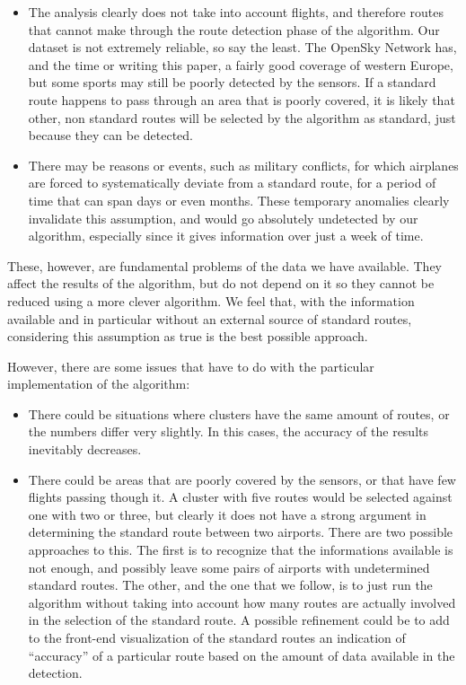 \documentclass{vldb}
\begin{document}
\begin{itemize}
  \item The analysis clearly does not take into account flights, and therefore
  routes that cannot make through the route detection phase of the algorithm.
  Our dataset is not extremely reliable, so say the least. The OpenSky Network
  has, and the time or writing this paper, a fairly good coverage of western
  Europe, but some sports may still be poorly detected by the sensors. If a
  standard route happens to pass through an area that is poorly covered, it is
  likely that other, non standard routes will be selected by the algorithm as
  standard, just because they can be detected.
  \item There may be reasons or events, such as military conflicts, for which
  airplanes are forced to systematically deviate from a standard route, for a
  period of time that can span days or even months. These temporary anomalies
  clearly invalidate this assumption, and would go absolutely undetected by our
  algorithm, especially since it gives information over just a week of time.
\end{itemize}

These, however, are fundamental problems of the data we have available. They
affect the results of the algorithm, but do not depend on it so they cannot be
reduced using a more clever algorithm. We feel that, with the information
available and in particular without an external source
of standard routes, considering this assumption as true is the best
possible approach.

However, there are some issues that have to do with the particular
implementation of the algorithm:

\begin{itemize}
  \item There could be situations where clusters have the same amount of routes,
  or the numbers differ very slightly. In this cases, the accuracy of the
  results inevitably decreases.
  \item There could be areas that are poorly covered by the sensors, or that
  have few flights passing though it. A cluster with five routes would be
  selected against one with two or three, but clearly it does not have a strong
  argument in determining the standard route between two airports. There are two
  possible approaches to this. The first is to recognize that the informations
  available is not enough, and possibly leave some pairs of airports with
  undetermined standard routes. The other, and the one that we follow, is to
  just run the algorithm without taking into account how many routes are
  actually involved in the selection of the standard route. A possible
  refinement could be to add to the front-end visualization of the standard
  routes an indication of ``accuracy'' of a particular route based on the amount
  of data available in the detection.
\end{itemize}
\end{document}
